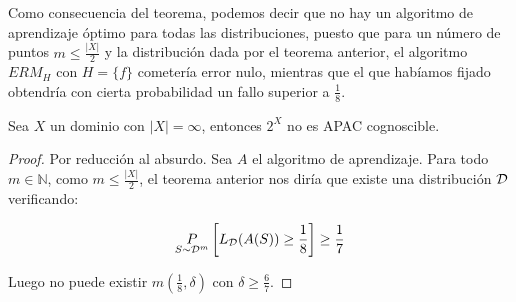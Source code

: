 Como consecuencia del teorema, podemos decir que no hay un algoritmo de aprendizaje óptimo para todas las 
distribuciones, puesto que para un número de puntos $m \le \frac{|X|}{2}$ y la distribución dada por el teorema
anterior, el algoritmo $ERM_H$ con $H = \{f\}$ cometería error nulo, mientras que el que habíamos fijado
obtendría con cierta probabilidad un fallo superior a $\frac{1}{8}$.

\begin{corollary}
 Sea $X$ un dominio con $|X| = \infty$, entonces $2^X$ no es APAC cognoscible.
\end{corollary}

\begin{proof}
 Por reducción al absurdo. Sea $A$ el algoritmo de aprendizaje. Para todo $m\in \mathbb{N}$, como 
 $m\le \frac{|X|}{2}$, el teorema anterior nos diría que existe una distribución $\mathcal{D}$ verificando:
 
 \[\underset{S\sim \mathcal{D}^m}{P} \left[ L_{\mathcal{D}}(A(S)) \ge \frac{1}{8} \right] \ge \frac{1}{7}\]
 
 Luego no puede existir $m \left(\frac{1}{8}, \delta\right)$ con $\delta \ge \frac{6}{7}$.
\end{proof}


